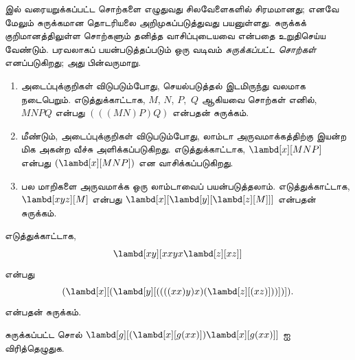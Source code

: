 \documentclass[../../../include/open-logic-section]{subfiles}
\begin{document}

 இல் வரையறுக்கப்பட்ட சொற்களை எழுதுவது சிலவேளைகளில்
சிரமமானது; எனவே மேலும் சுருக்கமான தொடரியலை அறிமுகப்படுத்துவது பயனுள்ளது.
சுருக்கக் குறிமானத்திலுள்ள சொற்களும் தனித்த வாசிப்புடையவை என்பதை உறுதிசெய்ய
வேண்டும். பரவலாகப் பயன்படுத்தப்படும் ஒரு வடிவம் \emph{சுருக்கப்பட்ட சொற்கள்}
எனப்படுகிறது; அது பின்வருமாறு.

\begin{enumerate}
\item அடைப்புக்குறிகள் விடுபடும்போது, செயல்படுத்தல் இடமிருந்து வலமாக
  நடைபெறும். எடுத்துக்காட்டாக, $M$, $N$, $P$,~$Q$ ஆகியவை சொற்கள் எனில்,
  $MNPQ$ என்பது $(((MN)P)Q)$ என்பதன் சுருக்கம்.
\item மீண்டும், அடைப்புக்குறிகள் விடுபடும்போது, லாம்டா அருவமாக்கத்திற்கு
  இயன்ற மிக அகன்ற வீச்சு அளிக்கப்படுகிறது.
  எடுத்துக்காட்டாக, $\lambd[x][MNP]$ என்பது $(\lambd[x][MNP])$ என வாசிக்கப்படுகிறது.
\item பல மாறிகளை அருவமாக்க ஒரு லாம்டாவைப் பயன்படுத்தலாம். எடுத்துக்காட்டாக,
  $\lambd[xyz][M]$ என்பது
  $\lambd[x][\lambd[y][\lambd[z][M]]]$ என்பதன் சுருக்கம்.
\end{enumerate}

எடுத்துக்காட்டாக,
\[
\lambd[xy][xxyx \lambd[z][xz]]
\]
என்பது
\[
(\lambd[x][(\lambd[y][((((xx)y)x)(\lambd[z][(xz)]))])]).
\]
என்பதன் சுருக்கம்.

\begin{prob}
சுருக்கப்பட்ட சொல் $\lambd[g][(\lambd[x][g (x x)])
  \lambd[x][g (x x)]]$ ஐ விரித்தெழுதுக.
\end{prob}
\end{document}
